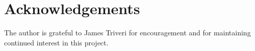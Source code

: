 \section*{Acknowledgements}
The author is grateful to James Triveri for encouragement and for maintaining continued interest in this project.